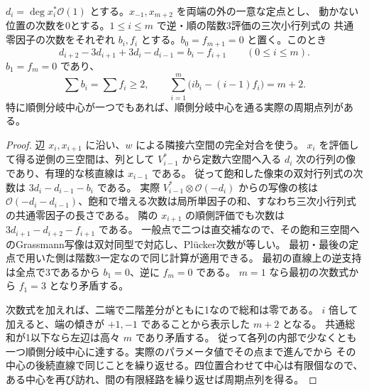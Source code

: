 \begin{proposition}\label{prop:branch-corridor-degree}
$d_i=\deg x_i^*\mathcal O(1)$ とする。$x_{-1},x_{m+2}$ を両端の外の一意な定点とし、
動かない位置の次数を0とする。$1\le i\le m$ で逆・順の階数3評価の三次小行列式の
共通零因子の次数をそれぞれ $b_i,f_i$ とする。$b_0=f_{m+1}=0$ と置く。このとき
\[
 d_{i+2}-3d_{i+1}+3d_i-d_{i-1}= b_i-f_{i+1}\qquad(0\le i\le m).
\]
$b_1=f_m=0$ であり、
\[
 \sum b_i=\sum f_i\ge2,\qquad
 \sum_{i=1}^m\big(i b_i-(i-1)f_i\big)=m+2 .
\]
特に順側分岐中心が一つでもあれば、順側分岐中心を通る実際の周期点列がある。
\end{proposition}
\begin{proof}
辺 $x_i,x_{i+1}$ に沿い、$w$ による隣接六空間の完全対合を使う。
$x_i$ を評価して得る逆側の三空間は、列として $V_{i-1}^*$ から定数六空間へ入る
$d_i$ 次の行列の像であり、有理的な核直線は $x_{i-1}$ である。
従って飽和した像束の双対行列式の次数は $3d_i-d_{i-1}-b_i$ である。
実際 $V_{i-1}^*\otimes\mathcal O(-d_i)$ からの写像の核は
$\mathcal O(-d_i-d_{i-1})$、飽和で増える次数は局所単因子の和、すなわち三次小行列式の共通零因子の長さである。
隣の $x_{i+1}$ の順側評価でも次数は $3d_{i+1}-d_{i+2}-f_{i+1}$ である。
一般点で二つは直交補なので、その飽和三空間へのGrassmann写像は双対同型で対応し、Plücker次数が等しい。
最初・最後の定点で用いた側は階数3一定なので同じ計算が適用できる。
最初の直線上の逆支持は全点で3であるから $b_1=0$、逆に $f_m=0$ である。
$m=1$ なら最初の次数式から $f_1=3$ となり矛盾する。

次数式を加えれば、二端で二階差分がともに1なので総和は零である。
$i$ 倍して加えると、端の傾きが $+1,-1$ であることから表示した $m+2$ となる。
共通総和が1以下なら左辺は高々 $m$ であり矛盾する。
従って各列の内部で少なくとも一つ順側分岐中心に達する。実際のパラメータ値でその点まで進んでから
その中心の後続直線で同じことを繰り返せる。四位置合わせて中心は有限個なので、
ある中心を再び訪れ、間の有限経路を繰り返せば周期点列を得る。
\end{proof}
